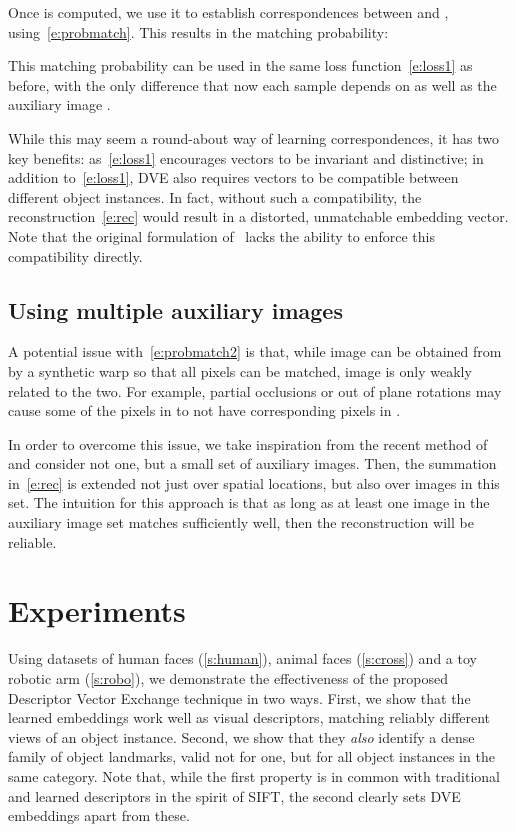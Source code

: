 \documentclass[10pt,twocolumn,letterpaper]{article}
\makeatletter
\renewcommand{\paragraph}{\@startsection{paragraph}{4}{\z@}{0.5em}{-1em}{\normalfont\normalsize\bfseries}}
\makeatother
\begin{document}
Once  is computed, we use it to establish correspondences between  and , using~\cref{e:probmatch}.
This results in the matching probability:

This matching probability can be used in the same loss function~\eqref{e:loss1} as before, with the only difference that now each sample depends on  as well as the auxiliary image .

\paragraph{Discussion.}

While this may seem a round-about way of learning correspondences, it has two key benefits: as~\cref{e:loss1} encourages vectors to be invariant and distinctive; in addition to~\cref{e:loss1}, DVE also requires vectors to be compatible between different object instances.
In fact, without such a compatibility, the reconstruction~\eqref{e:rec} would result in a distorted, unmatchable embedding vector.
Note that the original formulation of~\cite{thewlis17Bunsupervised} lacks the ability to enforce this compatibility directly.


\subsection{Using multiple auxiliary images}\label{s:group}

A potential issue with~\cref{e:probmatch2} is that, while image  can be obtained from  by a synthetic warp so that all pixels can be matched, image  is only weakly related to the two.
For example, partial occlusions or out of plane rotations may cause some of the pixels in  to not have corresponding pixels in .

In order to overcome this issue, we take inspiration from the recent method of~\cite{zhuang17attend} and consider not one, but a small set  of auxiliary images.
Then, the summation in~\cref{e:rec} is extended not just over spatial locations, but also over images in this set.
The intuition for this approach is that as long as at least one image in the auxiliary image set matches  sufficiently well, then the reconstruction will be reliable. 

\section{Experiments}\label{s:experiments}



Using datasets of human faces (\cref{s:human}), animal faces (\cref{s:cross}) and a toy robotic arm (\cref{s:robo}), we demonstrate the effectiveness of the proposed Descriptor Vector Exchange technique in two ways.
First, we show that the learned embeddings work well as visual descriptors, matching reliably different views of an object instance.
Second, we show that they \emph{also} identify a dense family of object landmarks, valid not for one, but for all object instances in the same category.
Note that, while the first property is in common with traditional and learned descriptors in the spirit of SIFT, the second clearly sets DVE embeddings apart from these.
\end{document}
